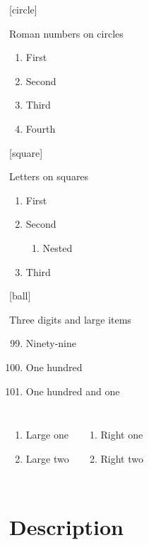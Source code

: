 \documentclass[aspectratio=169]{beamer}
\begin{document}
{
[circle]
\renewcommand\theenumi{\roman{enumi}}
\begin{frame}{Roman numbers on circles}
  \begin{enumerate}
    \item First
    \item Second
    \item Third
    \item Fourth
  \end{enumerate}
\end{frame}
}

{
[square]
\renewcommand\theenumi{\alph{enumi}}
\begin{frame}{Letters on squares}
  \begin{enumerate}
    \item First
    \item Second
      \begin{enumerate}
        \item Nested
      \end{enumerate}
    \item Third
  \end{enumerate}
\end{frame}
}

{
[ball]
\begin{frame}{Three digits and large items}
  \begin{enumerate}
    \setcounter{enumi}{98}
    \item Ninety-nine
    \item One hundred
    \item One hundred and one
  \end{enumerate}
  \begin{columns}[T]
    \large
    \begin{enumerate}
      \item Large one
      \item Large two
    \end{enumerate}
    \begin{enumerate}
      \item Right one
      \item Right two
    \end{enumerate}
  \end{columns}
\end{frame}
}

\section{Description}
\end{document}
